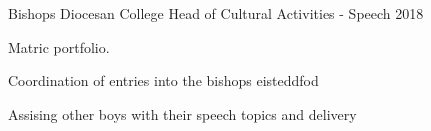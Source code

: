 \begin{cventries}
\cventry
{Bishops Diocesan College} %
{Head of Cultural Activities - Speech} %
{2018} %
{} %
{
  \begin{cvitems} %
    \item {Matric portfolio.}
    \item {Coordination of entries into the bishops eisteddfod}
    \item {Assising other boys with their speech topics and delivery}
  \end{cvitems}
}
    
\end{cventries}
    
